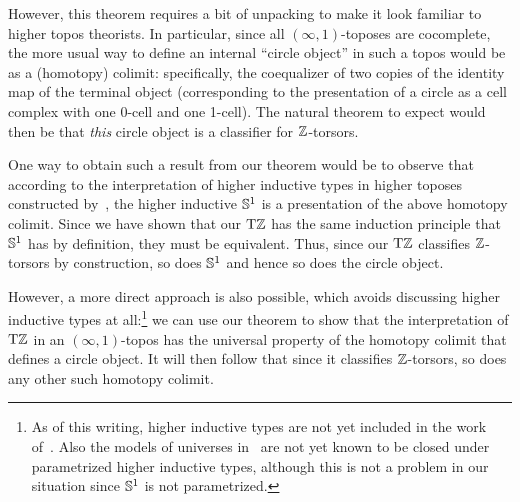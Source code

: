 \documentclass[a4paper,12pt]{amsart}
\begin{document}
However, this theorem requires a bit of unpacking to make it look familiar to higher topos theorists.
In particular, since all $(\infty,1)$-toposes are cocomplete, the more usual way to define an internal ``circle object'' in such a topos would be as a (homotopy) colimit: specifically, the coequalizer of two copies of the identity map of the terminal object (corresponding to the presentation of a circle as a cell complex with one 0-cell and one 1-cell).
The natural theorem to expect would then be that \emph{this} circle object is a classifier for $\mathbb{Z}$-torsors.

One way to obtain such a result from our theorem would be to observe that according to the interpretation of higher inductive types in higher toposes constructed by~\cite{1705.07088}, the higher inductive ${\mathbb{S}^1}$ is a presentation of the above homotopy colimit.
Since we have shown that our ${\mathrm{T}\mathbb{Z}}$ has the same induction principle that ${\mathbb{S}^1}$ has by definition, they must be equivalent.
Thus, since our ${\mathrm{T}\mathbb{Z}}$ classifies $\mathbb{Z}$-torsors by construction, so does ${\mathbb{S}^1}$ and hence so does the circle object.

However, a more direct approach is also possible, which avoids discussing higher inductive types at all:\footnote{As of this writing, higher inductive types are not yet included in the work of~\cite{initiality}.  Also the models of universes in~\cite{shulman:univinj} are not yet known to be closed under parametrized higher inductive types, although this is not a problem in our situation since ${\mathbb{S}^1}$ is not parametrized.} we can use our theorem to show that the interpretation of ${\mathrm{T}\mathbb{Z}}$ in an $(\infty,1)$-topos has the universal property of the homotopy colimit that defines a circle object.
It will then follow that since it classifies $\mathbb{Z}$-torsors, so does any other such homotopy colimit.
\end{document}
